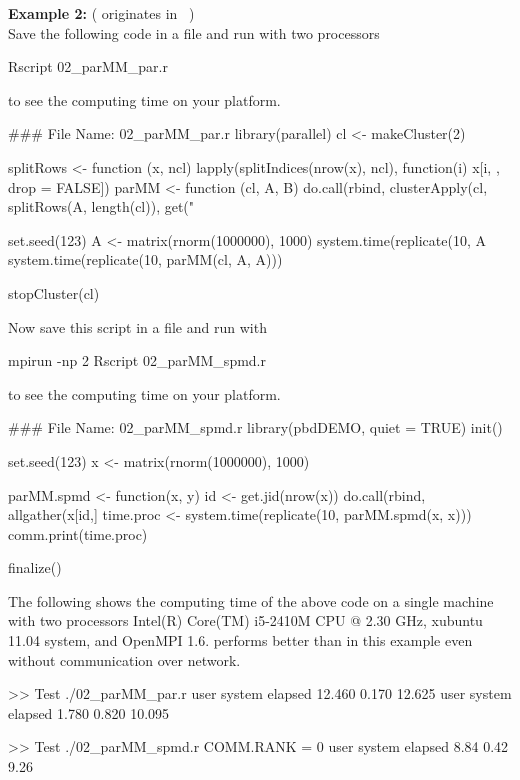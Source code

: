 {\bf Example 2:} ( originates in ~\citep{Tierney2012}) \\
Save the following code in a file and run with two processors
\begin{Command}
Rscript 02_parMM_par.r
\end{Command}
to see the computing time on your platform.
\begin{Code}[title=\pkg{snow} R Script]
### File Name: 02_parMM_par.r
library(parallel)
cl <- makeCluster(2)

splitRows <- function (x, ncl){
  lapply(splitIndices(nrow(x), ncl), function(i) x[i, , drop = FALSE])
}
parMM <- function (cl, A, B){
  do.call(rbind, clusterApply(cl, splitRows(A, length(cl)), get("%
}

set.seed(123)
A <- matrix(rnorm(1000000), 1000)
system.time(replicate(10, A %
system.time(replicate(10, parMM(cl, A, A)))

stopCluster(cl)
\end{Code}
Now save this script in a file and run with
\begin{Command}
mpirun -np 2 Rscript 02_parMM_spmd.r
\end{Command}
to see the computing time on your platform.
\begin{Code}[title=SPMD R Script]
### File Name: 02_parMM_spmd.r
library(pbdDEMO, quiet = TRUE)
init()

set.seed(123)
x <- matrix(rnorm(1000000), 1000)

parMM.spmd <- function(x, y){
  id <- get.jid(nrow(x))
  do.call(rbind, allgather(x[id,] %
}
time.proc <- system.time(replicate(10, parMM.spmd(x, x)))
comm.print(time.proc)

finalize()
\end{Code}

The following shows the computing time of the above code
on a single machine with two processors
Intel(R) Core(TM) i5-2410M CPU @ 2.30 GHz, xubuntu 11.04 system,
and OpenMPI 1.6.  performs better than  in this
example even without communication over network.
\begin{CodeOutput}
>> Test ./02_parMM_par.r
   user  system elapsed 
 12.460   0.170  12.625 
   user  system elapsed 
  1.780   0.820  10.095 

>> Test ./02_parMM_spmd.r
COMM.RANK = 0
   user  system elapsed 
   8.84    0.42    9.26 
\end{CodeOutput}
